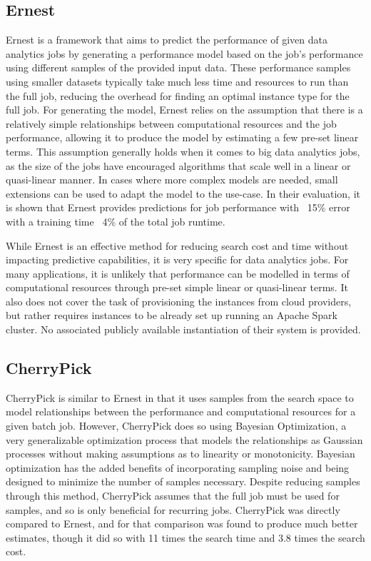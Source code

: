 \documentclass{report}
\begin{document}
\subsection{Ernest}
Ernest\cite{Venkataraman2016} is a framework that aims to predict the performance of given data analytics jobs by generating a performance model based on the job's performance using different samples of the provided input data. These performance samples using smaller datasets typically take much less time and resources to run than the full job, reducing the overhead for finding an optimal instance type for the full job. For generating the model, Ernest relies on the assumption that there is a relatively simple relationships between computational resources and the job performance, allowing it to  produce the model by estimating a few pre-set linear terms. This assumption generally holds when it comes to big data analytics jobs, as the size of the jobs have encouraged algorithms that scale well in a linear or quasi-linear manner\cite{Bottou2008}. In cases where more complex models are needed, small extensions can be used to adapt the model to the use-case. In their evaluation, it is shown that Ernest provides predictions for job performance with ~15\% error with a training time ~4\% of the total job runtime.

While Ernest is an effective method for reducing search cost and time without impacting predictive capabilities, it is very specific for data analytics jobs. For many applications, it is unlikely that performance can be modelled in terms of computational resources through pre-set simple linear or quasi-linear terms. It also does not cover the task of provisioning the instances from cloud providers, but rather requires instances to be already set up running an Apache Spark cluster. No associated publicly available instantiation of their system is provided.

\subsection{CherryPick}
CherryPick \cite{Alipourfard2017} is similar to Ernest in that it uses samples from the search space to model relationships between the performance and computational resources for a given batch job. However, CherryPick does so using Bayesian Optimization, a very generalizable optimization process that models the relationships as Gaussian processes without making assumptions as to linearity or monotonicity. Bayesian optimization has the added benefits of incorporating sampling noise and being designed to minimize the number of samples necessary. Despite reducing samples through this method, CherryPick assumes that the full job must be used for samples, and so is only beneficial for recurring jobs. CherryPick was directly compared to Ernest, and for that comparison was found to produce much better estimates, though it did so with 11 times the search time and 3.8 times the search cost\cite{Alipourfard2017}. 
\end{document}
